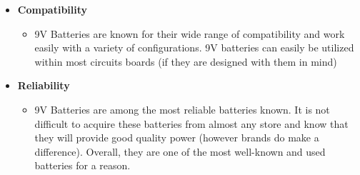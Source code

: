 \documentclass[12pt]{article}
\begin{document}
{\begin{itemize}
\begin{itemize}
					\end{itemize}
					\item \textbf{Compatibility}
					\begin{itemize}
						\item 9V Batteries are known for their wide range of compatibility and work easily with a variety of configurations. 9V batteries can easily be utilized within most circuits boards (if they are designed with them in mind)
					\end{itemize}
					\item \textbf{Reliability}
					\begin{itemize}
						\item 9V Batteries are among the most reliable batteries known. It is not difficult to acquire these batteries from almost any store and know that they will provide good quality power (however brands do make a difference). Overall, they are one of the most well-known and used batteries for a reason.
					\end{itemize}
				\end{itemize}
				}
				
\end{document}
